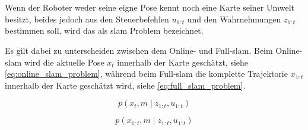 \section{}




Wenn der Roboter weder seine eigne Pose kennt noch eine Karte seiner Umwelt besitzt, beides jedoch aus den Steuerbefehlen $u_{1:t}$ und den Wahrnehmungen $z_{1:t}$ bestimmen soll, wird das als \Gls{slam}\footnotemark{} Problem bezeichnet. 


Es gilt dabei zu unterscheiden zwischen dem Online- und Full-\gls{slam}. Beim Online-\gls{slam} wird die aktuelle Pose $x_t$ innerhalb der Karte geschätzt, siehe \autoref{eq:online_slam_problem}, während beim Full-\gls{slam} die komplette Trajektorie $x_{1:t}$ innerhalb der Karte geschätzt wird, siehe \autoref{eq:full_slam_problem}.

\begin{equation}
p(x_t, m \mid z_{1:t}, u_{1:t}) \label{eq:online_slam_problem}
\end{equation}

\begin{equation}
p(x_{1:t}, m \mid z_{1:t}, u_{1:t}) \label{eq:full_slam_problem}
\end{equation}


